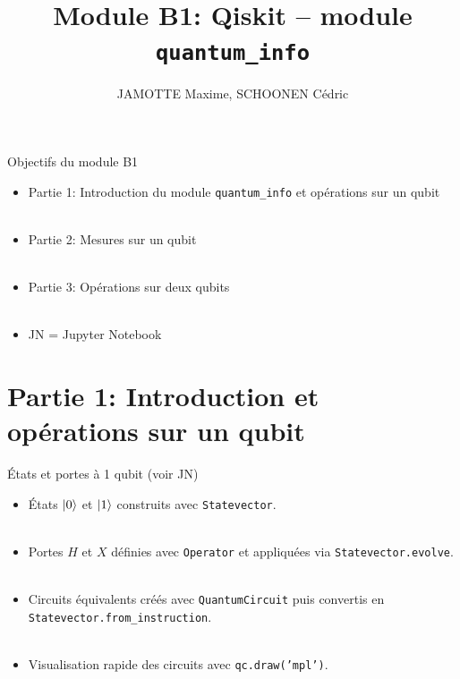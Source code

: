 \documentclass[aspectratio=169,12pt]{beamer}
\title[Module B1]{Module B1: Qiskit -- module \texttt{quantum\_info}}
\author{JAMOTTE Maxime, SCHOONEN Cédric}
\institute{Digital Learning Hub}
\date{}
\begin{document}
\begin{frame}
  \titlepage
\end{frame}

\begin{frame}{Objectifs du module B1}
  \begin{itemize}
    \item Partie 1: Introduction du module \texttt{quantum\_info} et opérations sur un qubit\\~\\
    \item Partie 2: Mesures sur un qubit\\~\\
    \item Partie 3: Opérations sur deux qubits\\~\\
    \item JN = Jupyter Notebook
  \end{itemize}
\end{frame}

\section{Partie 1: Introduction et opérations sur un qubit}

\begin{frame}{États et portes à 1 qubit (voir JN)}
  \begin{itemize}
    \item États \(\ket{0}\) et \(\ket{1}\) construits avec \texttt{Statevector}.\\~\\
    \item Portes \(H\) et \(X\) définies avec \texttt{Operator} et appliquées via \texttt{Statevector.evolve}.\\~\\
    \item Circuits équivalents créés avec \texttt{QuantumCircuit} puis convertis en \texttt{Statevector.from\_instruction}.\\~\\
    \item Visualisation rapide des circuits avec \texttt{qc.draw('mpl')}.
  \end{itemize}
\end{frame}
\end{document}
